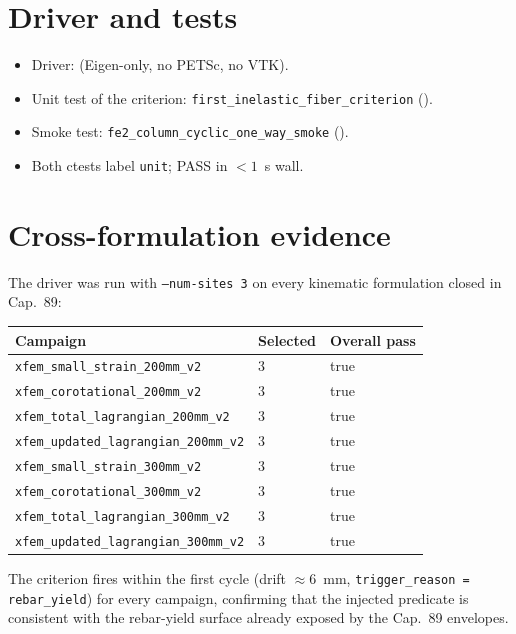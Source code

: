 \section{Driver and tests}

\begin{itemize}
  \item Driver:  (Eigen-only,
        no PETSc, no VTK).
  \item Unit test of the criterion: \texttt{first\_inelastic\_fiber\_criterion}
        ().
  \item Smoke test: \texttt{fe2\_column\_cyclic\_one\_way\_smoke}
        ().
  \item Both ctests label \texttt{unit}; PASS in $<1$~s wall.
\end{itemize}

\section{Cross-formulation evidence}

The driver was run with \texttt{--num-sites 3} on every kinematic
formulation closed in Cap.~89:

\begin{center}
\begin{tabular}{lll}
\hline
Campaign & Selected & Overall pass \\
\hline
\texttt{xfem\_small\_strain\_200mm\_v2}       & 3 & true \\
\texttt{xfem\_corotational\_200mm\_v2}        & 3 & true \\
\texttt{xfem\_total\_lagrangian\_200mm\_v2}   & 3 & true \\
\texttt{xfem\_updated\_lagrangian\_200mm\_v2} & 3 & true \\
\texttt{xfem\_small\_strain\_300mm\_v2}       & 3 & true \\
\texttt{xfem\_corotational\_300mm\_v2}        & 3 & true \\
\texttt{xfem\_total\_lagrangian\_300mm\_v2}   & 3 & true \\
\texttt{xfem\_updated\_lagrangian\_300mm\_v2} & 3 & true \\
\hline
\end{tabular}
\end{center}

\noindent
The criterion fires within the first cycle (drift $\approx 6$~mm,
\texttt{trigger\_reason = rebar\_yield}) for every campaign, confirming
that the injected predicate is consistent with the rebar-yield surface
already exposed by the Cap.~89 envelopes.

